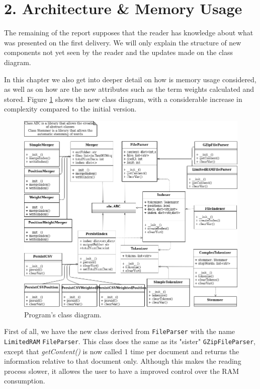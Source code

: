 \documentclass[12pt]{article}
\begin{document}
\section*{2. Architecture \& Memory Usage}

The remaining of the report supposes that the reader has knowledge about what
was presented on the first delivery. 
We will only explain the structure of new components not yet seen by the reader 
and the updates made on the class diagram.

In this chapter we also get into deeper detail on how is memory usage
considered, as well as on how are the new attributes such as the term weights 
calculated and stored.
Figure \ref{fig:classdiagram} shows the new class diagram, with a considerable
increase in complexity compared to the initial version.

\begin{figure}[h!]
\includegraphics[width=\linewidth]{ClassDiagram_assign2.png}
\caption{Program's class diagram.}
\label{fig:classdiagram}
\end{figure}

First of all, we have the new class derived from \texttt{FileParser} with the
name \texttt{LimitedRAM} \texttt{FileParser}. This class does the same as its 
"sister" \texttt{GZipFileParser}, except that \textit{getContent()} is now 
called 1 time per document and returns the information relative to that 
document only. 
Although this makes the reading process slower, it allowes the user to have a 
improved control over the RAM consumption.
\end{document}
